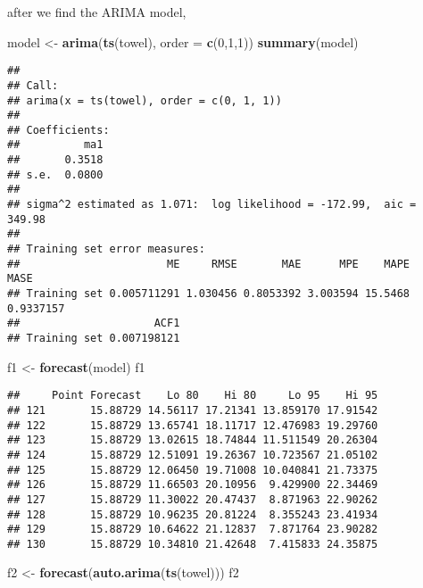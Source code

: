 \documentclass[
]{article}
\newenvironment{Shaded}{\begin{snugshade}}{\end{snugshade}}
\newcommand{\AttributeTok}[1]{\textcolor[rgb]{0.13,0.29,0.53}{#1}}
\newcommand{\DecValTok}[1]{\textcolor[rgb]{0.00,0.00,0.81}{#1}}
\newcommand{\FunctionTok}[1]{\textcolor[rgb]{0.13,0.29,0.53}{\textbf{#1}}}
\newcommand{\NormalTok}[1]{#1}
\newcommand{\OtherTok}[1]{\textcolor[rgb]{0.56,0.35,0.01}{#1}}
\begin{document}
after we find the ARIMA model,

\begin{Shaded}
\begin{Highlighting}[]
\NormalTok{model }\OtherTok{\textless{}{-}} \FunctionTok{arima}\NormalTok{(}\FunctionTok{ts}\NormalTok{(towel), }\AttributeTok{order =} \FunctionTok{c}\NormalTok{(}\DecValTok{0}\NormalTok{,}\DecValTok{1}\NormalTok{,}\DecValTok{1}\NormalTok{))}
\FunctionTok{summary}\NormalTok{(model)}
\end{Highlighting}
\end{Shaded}

\begin{verbatim}
## 
## Call:
## arima(x = ts(towel), order = c(0, 1, 1))
## 
## Coefficients:
##          ma1
##       0.3518
## s.e.  0.0800
## 
## sigma^2 estimated as 1.071:  log likelihood = -172.99,  aic = 349.98
## 
## Training set error measures:
##                       ME     RMSE       MAE      MPE    MAPE      MASE
## Training set 0.005711291 1.030456 0.8053392 3.003594 15.5468 0.9337157
##                     ACF1
## Training set 0.007198121
\end{verbatim}

\begin{Shaded}
\begin{Highlighting}[]
\NormalTok{f1 }\OtherTok{\textless{}{-}} \FunctionTok{forecast}\NormalTok{(model)}
\NormalTok{f1}
\end{Highlighting}
\end{Shaded}

\begin{verbatim}
##     Point Forecast    Lo 80    Hi 80     Lo 95    Hi 95
## 121       15.88729 14.56117 17.21341 13.859170 17.91542
## 122       15.88729 13.65741 18.11717 12.476983 19.29760
## 123       15.88729 13.02615 18.74844 11.511549 20.26304
## 124       15.88729 12.51091 19.26367 10.723567 21.05102
## 125       15.88729 12.06450 19.71008 10.040841 21.73375
## 126       15.88729 11.66503 20.10956  9.429900 22.34469
## 127       15.88729 11.30022 20.47437  8.871963 22.90262
## 128       15.88729 10.96235 20.81224  8.355243 23.41934
## 129       15.88729 10.64622 21.12837  7.871764 23.90282
## 130       15.88729 10.34810 21.42648  7.415833 24.35875
\end{verbatim}

\begin{Shaded}
\begin{Highlighting}[]
\NormalTok{f2 }\OtherTok{\textless{}{-}} \FunctionTok{forecast}\NormalTok{(}\FunctionTok{auto.arima}\NormalTok{(}\FunctionTok{ts}\NormalTok{(towel)))}
\NormalTok{f2}
\end{Highlighting}
\end{Shaded}
\end{document}
